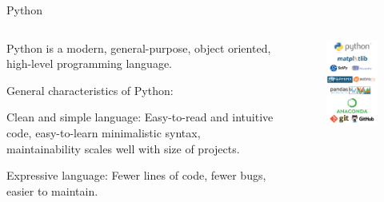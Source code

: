 \documentclass[serif ,mathserif, 8pt]{beamer}
\begin{document}
\begin{frame}{Python}
\begin{columns}[c]
	\begin{column}{0.6\textwidth}
		Python is a modern, general-purpose, object oriented, high-level programming language.
		
		General characteristics of Python:
		
		Clean and simple language: Easy-to-read and intuitive code, easy-to-learn minimalistic syntax, maintainability scales well with size of projects.
		
		Expressive language: Fewer lines of code, fewer bugs, easier to maintain.
	\end{column}
	
	\begin{column}{0.4\textwidth}
		\begin{figure}
			\includegraphics[width=.8\linewidth]{images/python}
		\end{figure}
	\end{column}
\end{columns}

\end{frame}
\end{document}
